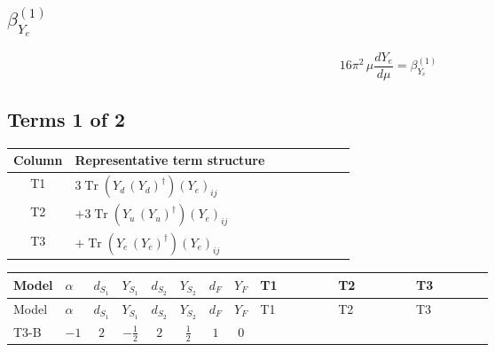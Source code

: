 \documentclass[8pt]{article}
\begin{document}
\begin{landscape}
\section*{$\beta_{Y_e}^{(1)}$}
\[16\pi^2\,\mu\frac{d Y_e}{d\mu}=\beta_{Y_e}^{(1)}\]
\subsection*{Terms 1 of 2}
\begin{center}
\begin{tabular}{@{}c >{\raggedright\arraybackslash}p{0.82\linewidth}@{}}
\toprule
Column & Representative term structure \\
\midrule
T1 & \(\displaystyle 3 \operatorname{Tr}\!\left({Y_d}\,\left({Y_d}\right)^{\dagger}\right) \left({Y_e}\right)_{ij}\) \\
\midrule
T2 & \(\displaystyle +3 \operatorname{Tr}\!\left({Y_u}\,\left({Y_u}\right)^{\dagger}\right) \left({Y_e}\right)_{ij}\) \\
\midrule
T3 & \(\displaystyle +\operatorname{Tr}\!\left({Y_e}\,\left({Y_e}\right)^{\dagger}\right) \left({Y_e}\right)_{ij}\) \\
\midrule
\bottomrule
\end{tabular}
\end{center}
\smallskip
\tiny
\begin{longtable}{@{}llcccccc >{\raggedright\arraybackslash}p{0.21\linewidth} >{\raggedright\arraybackslash}p{0.21\linewidth} >{\raggedright\arraybackslash}p{0.21\linewidth}@{}}
\toprule
Model & $\alpha$ & $d_{S_1}$ & $Y_{S_1}$ & $d_{S_2}$ & $Y_{S_2}$ & $d_F$ & $Y_F$ & T1 & T2 & T3 \\
\midrule
\endfirsthead
\toprule
Model & $\alpha$ & $d_{S_1}$ & $Y_{S_1}$ & $d_{S_2}$ & $Y_{S_2}$ & $d_F$ & $Y_F$ & T1 & T2 & T3 \\
\midrule
\endhead
T3-B & $-1$ & $2$ & $-\frac{1}{2}$ & $2$ & $\frac{1}{2}$ & $1$ & $0$ & \scriptsize\adjustbox{max width=\linewidth}{$\begin{gathered} 3 \operatorname{Tr}\!\left({Y_d}\,\left({Y_d}\right)^{\dagger}\right) \left({Y_e}\right)_{ij}\end{gathered}$} & \scriptsize\adjustbox{max width=\linewidth}{$\begin{gathered} +3 \operatorname{Tr}\!\left({Y_u}\,\left({Y_u}\right)^{\dagger}\right) \left({Y_e}\right)_{ij}\end{gathered}$} & \scriptsize\adjustbox{max width=\linewidth}{$\begin{gathered} +\operatorname{Tr}\!\left({Y_e}\,\left({Y_e}\right)^{\dagger}\right) \left({Y_e}\right)_{ij}\end{gathered}$} \\

\end{longtable}
\end{landscape}
\end{document}
